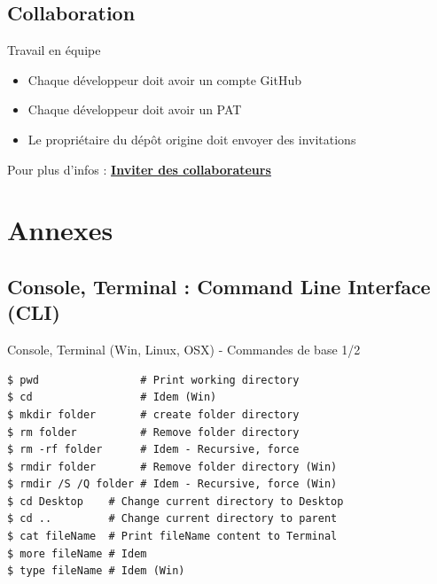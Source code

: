 \documentclass[a4paper,11pt]{beamer}
\begin{document}
\subsection{Collaboration}
\begin{frame}

\begin{alertblock}{Travail en équipe}
\begin{itemize}
    \item Chaque développeur doit avoir un compte GitHub
    \item Chaque développeur doit avoir un PAT
    \item Le propriétaire du dépôt origine doit envoyer des invitations
\end{itemize}
\end{alertblock}
\centering
Pour plus d'infos : \textcolor{blue}{\textbf{\underline{\href{https://docs.github.com/en/enterprise-server@3.10/account-and-profile/setting-up-and-managing-your-personal-account-on-github/managing-access-to-your-personal-repositories/inviting-collaborators-to-a-personal-repository}{Inviter des collaborateurs}}}}
\end{frame}

\section{Annexes}
\subsection{Console, Terminal : Command Line Interface (CLI)}
\begin{frame}[containsverbatim]

\begin{block}{Console, Terminal (Win, Linux, OSX) - Commandes de base 1/2}
\begin{lstlisting}
$ pwd                # Print working directory
$ cd                 # Idem (Win)
$ mkdir folder       # create folder directory
$ rm folder          # Remove folder directory
$ rm -rf folder	     # Idem - Recursive, force
$ rmdir folder	     # Remove folder directory (Win)
$ rmdir /S /Q folder # Idem - Recursive, force (Win)
$ cd Desktop    # Change current directory to Desktop
$ cd ..         # Change current directory to parent
$ cat fileName  # Print fileName content to Terminal
$ more fileName # Idem
$ type fileName # Idem (Win)
\end{lstlisting}
\end{block}
\end{frame}
\end{document}
